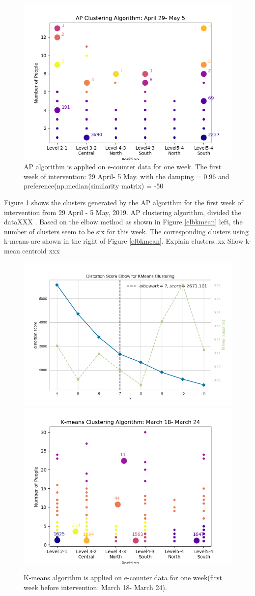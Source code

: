 \begin{figure}[!h]
    \centering
    \includegraphics[width = 11 cm]{image/Chapters/Chapter6/ApFirstWeekIntervention1.png}
    \caption{AP algorithm is applied on e-counter data for one week. The first week of intervention: 29 April- 5 May. with the damping = 0.96 and preference(np.median(similarity matrix) = -50 }
    \label{oneweek}
\end{figure}
    
Figure \ref{oneweek} shows the clusters generated by the AP algorithm for the first week of intervention from 29 April - 5 May, 2019. AP clustering algorithm, divided the dataXXX .
Based on the elbow method as shown in Figure \ref{elbkmean} left, the number of clusters seem to be six for this week. The corresponding clusters using k-means  are shown in the right of Figure \ref{elbkmean}. Explain clusters..xx Show k-mean centroid xxx
 


\begin{figure}[!h]
    \centering
    \includegraphics[width=.49\textwidth]{image/Chapters/Chapter6/elbowBeforerInt.png}
    \includegraphics[width=.49\textwidth]{image/Chapters/Chapter6/kmeans1WeekBefore.png}
    \caption{K-means algorithm is applied on e-counter data for one week(first week before intervention: March 18- March 24).}
    \label{beforAPp}
\end{figure}   
   


